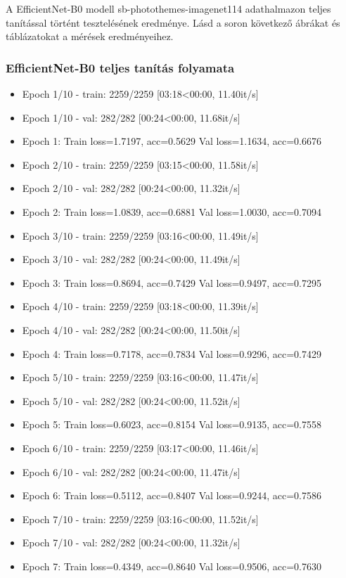 A EfficientNet-B0 modell sb-photothemes-imagenet114 adathalmazon teljes tanítással történt tesztelésének eredménye. Lásd a soron következő ábrákat és táblázatokat a mérések eredményeihez.

\subsubsection{EfficientNet-B0 teljes tanítás folyamata}
\begin{itemize} 
	\item Epoch 1/10 - train: 2259/2259 [03:18<00:00, 11.40it/s]
	\item Epoch 1/10 - val: 282/282 [00:24<00:00, 11.68it/s]
	\item Epoch 1: Train loss=1.7197, acc=0.5629 Val loss=1.1634, acc=0.6676
	\item Epoch 2/10 - train: 2259/2259 [03:15<00:00, 11.58it/s]
	\item Epoch 2/10 - val: 282/282 [00:24<00:00, 11.32it/s]
	\item Epoch 2: Train loss=1.0839, acc=0.6881 Val loss=1.0030, acc=0.7094
	\item Epoch 3/10 - train: 2259/2259 [03:16<00:00, 11.49it/s]
	\item Epoch 3/10 - val: 282/282 [00:24<00:00, 11.49it/s]
	\item Epoch 3: Train loss=0.8694, acc=0.7429 Val loss=0.9497, acc=0.7295
	\item Epoch 4/10 - train: 2259/2259 [03:18<00:00, 11.39it/s]
	\item Epoch 4/10 - val: 282/282 [00:24<00:00, 11.50it/s]
	\item Epoch 4: Train loss=0.7178, acc=0.7834 Val loss=0.9296, acc=0.7429
	\item Epoch 5/10 - train: 2259/2259 [03:16<00:00, 11.47it/s]
	\item Epoch 5/10 - val: 282/282 [00:24<00:00, 11.52it/s]
	\item Epoch 5: Train loss=0.6023, acc=0.8154 Val loss=0.9135, acc=0.7558
	\item Epoch 6/10 - train: 2259/2259 [03:17<00:00, 11.46it/s]
	\item Epoch 6/10 - val: 282/282 [00:24<00:00, 11.47it/s]
	\item Epoch 6: Train loss=0.5112, acc=0.8407 Val loss=0.9244, acc=0.7586
	\item Epoch 7/10 - train: 2259/2259 [03:16<00:00, 11.52it/s]
	\item Epoch 7/10 - val: 282/282 [00:24<00:00, 11.32it/s]
	\item Epoch 7: Train loss=0.4349, acc=0.8640 Val loss=0.9506, acc=0.7630

\end{itemize}
